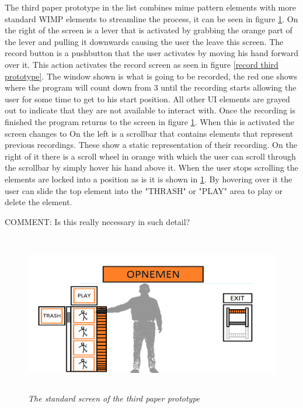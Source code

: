 The third paper prototype in the list combines mime pattern elements with more standard WIMP elements to streamline the process, it can be seen in figure \ref{standard third prototype}. On the right of the screen is a lever that is activated by grabbing the orange part of the lever and pulling it downwards causing the user the leave this screen. The record button is a pushbutton that the user activates by moving his hand forward over it. This action activates the record screen as seen in figure \ref{record third prototype}. The window shown is what is going to be recorded, the red one shows where the program will count down from 3 until the recording starts allowing the user for some time to get to his start position. All other UI elements are grayed out to indicate that they are not available to interact with. Once the recording is finished the program returns to the screen in figure \ref{standard third prototype}. When this is activated the screen changes to  On the left is a scrollbar that contains elements that represent previous recordings. These show a static representation of their recording. On the right of it there is a scroll wheel in orange with which the user can scroll through the scrollbar by simply hover his hand above it. When the user stops scrolling the elements are locked into a position as is it is shown in \ref{standard third prototype}. By hovering over it the user can slide the top element into the "THRASH" or "PLAY" area to play or delete the element. 

{\large COMMENT: Is this really necessary in such detail?}

\begin{figure}[H]
	\begin{center}
		\includegraphics[width=12.5cm, height=7cm]{figures/prototype_5_3_standard.png}
		\caption{\emph{The standard screen of the third paper prototype}}
		\label{standard third prototype}
	\end{center}
\end{figure}

